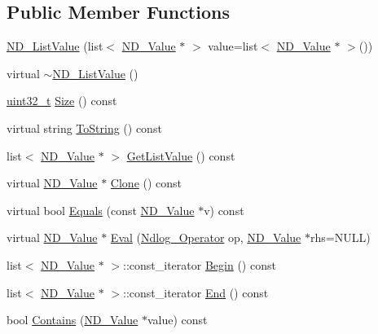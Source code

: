 \subsection*{Public Member Functions}
\begin{DoxyCompactItemize}
\item 
\hyperlink{class_n_d___list_value_a9ec9da85fb379f51c0d7371b6d8e4e30}{N\-D\-\_\-\-List\-Value} (list$<$ \hyperlink{class_n_d___value}{N\-D\-\_\-\-Value} $\ast$ $>$ value=list$<$ \hyperlink{class_n_d___value}{N\-D\-\_\-\-Value} $\ast$ $>$())
\item 
virtual \hyperlink{class_n_d___list_value_a62cbd2fbb556db9bbda27a89f3d2a91f}{$\sim$\-N\-D\-\_\-\-List\-Value} ()
\item 
\hyperlink{msus_2webserver_2uthash_8h_a435d1572bf3f880d55459d9805097f62}{uint32\-\_\-t} \hyperlink{class_n_d___list_value_acdc4e7affa401236591745355f934863}{Size} () const 
\item 
virtual string \hyperlink{class_n_d___list_value_a780732e62252f946dd96da074dd932b9}{To\-String} () const 
\item 
list$<$ \hyperlink{class_n_d___value}{N\-D\-\_\-\-Value} $\ast$ $>$ \hyperlink{class_n_d___list_value_a83723439f1b2c24cf7ec0b61299fd7fe}{Get\-List\-Value} () const 
\item 
virtual \hyperlink{class_n_d___value}{N\-D\-\_\-\-Value} $\ast$ \hyperlink{class_n_d___list_value_a3c42817a587145b39fbf58f0b5f7fb4a}{Clone} () const 
\item 
virtual bool \hyperlink{class_n_d___list_value_ad1c1105cd71f6e074c75780b57aa0bdb}{Equals} (const \hyperlink{class_n_d___value}{N\-D\-\_\-\-Value} $\ast$v) const 
\item 
virtual \hyperlink{class_n_d___value}{N\-D\-\_\-\-Value} $\ast$ \hyperlink{class_n_d___list_value_a38730f35b7d9fb26738294116c2e8b50}{Eval} (\hyperlink{_n_dvalue_8h_afc938fb729c95de25b4d2eb18640b303}{Ndlog\-\_\-\-Operator} op, \hyperlink{class_n_d___value}{N\-D\-\_\-\-Value} $\ast$rhs=N\-U\-L\-L)
\item 
list$<$ \hyperlink{class_n_d___value}{N\-D\-\_\-\-Value} $\ast$ $>$\-::const\-\_\-iterator \hyperlink{class_n_d___list_value_a74c21aaa5fae266a242983c80f90314c}{Begin} () const 
\item 
list$<$ \hyperlink{class_n_d___value}{N\-D\-\_\-\-Value} $\ast$ $>$\-::const\-\_\-iterator \hyperlink{class_n_d___list_value_a343d0ecc007c6918d0b166a402681fff}{End} () const 
\item 
bool \hyperlink{class_n_d___list_value_a7a2eeaf9bd337c940e20238f77e6f660}{Contains} (\hyperlink{class_n_d___value}{N\-D\-\_\-\-Value} $\ast$value) const 
\end{DoxyCompactItemize}
